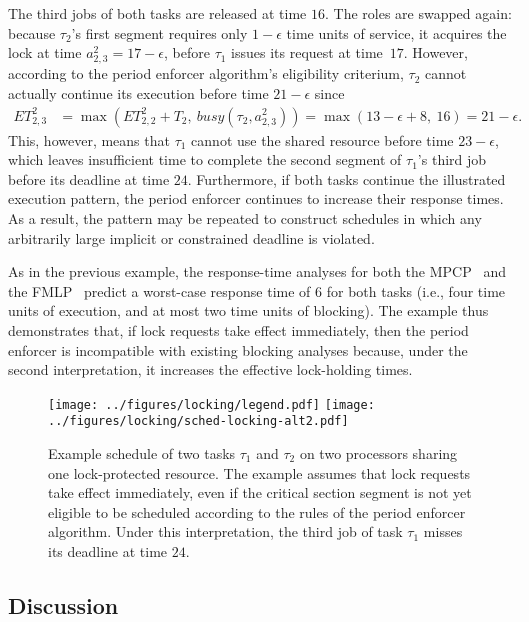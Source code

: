 The third jobs of both tasks are released at time $16$. The roles are swapped again: because $\tau_2$'s first segment requires only $1-\epsilon$ time units of service, it acquires the lock at time $a^2_{2,3} = 17 - \epsilon$, before $\tau_1$ issues its request at time~$17$. However, according to the period enforcer algorithm's eligibility criterium, $\tau_2$ cannot actually continue its execution before time $21- \epsilon$ since
\begin{align*}
	ET_{2,3}^2 & = \max\left(ET_{2,2}^2 + T_2,\ \mathit{busy}(\tau_2, a^2_{2,3})\right) =\max(13- \epsilon + 8,\ 16) = 21- \epsilon.
\end{align*}
This, however, means that $\tau_1$ cannot use the shared resource before time $23 - \epsilon$, which leaves insufficient time to complete the second segment of $\tau_1$'s third job before its deadline at time $24$.
Furthermore, if both tasks continue the illustrated execution pattern, the period enforcer continues to increase their response times. As a result, the pattern may be repeated to construct schedules in which any arbitrarily large implicit or constrained deadline is violated.

As in the previous example,  the response-time analyses for both the MPCP~\cite{Br:13,LNR:09} and the   FMLP~\cite{Br:13} predict a worst-case response time of $6$ for both tasks (i.e., four time units of execution, and at most two time units of blocking). The example thus demonstrates that, if lock requests take effect immediately, then the period enforcer is incompatible with existing blocking analyses because, under the second interpretation, it increases the effective lock-holding times.


\begin{figure}[t]
  \centering
  \texttt{[image: ../figures/locking/legend.pdf]}
  \texttt{[image: ../figures/locking/sched-locking-alt2.pdf]}
  \caption{Example schedule of two tasks $\tau_1$ and $\tau_2$ on two processors sharing one lock-protected resource. The example assumes that lock requests take effect immediately, even if the critical section segment is not yet eligible to be scheduled according to the rules of the period enforcer algorithm. Under this interpretation, the third job of task $\tau_1$ misses its deadline at time $24$.}
  \label{fig:locking-alt2}
\end{figure}

\subsection{Discussion}

